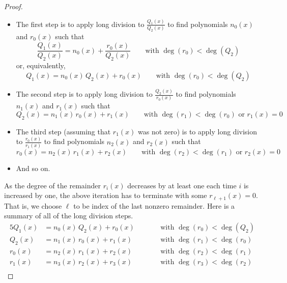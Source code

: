 \begin{proof}
\begin{itemize}\itemsep1pt \parskip0pt  %
\item
The first step is to apply long division to $\frac{Q_1(x)}{Q_2(x)}$ 
to find polynomials $n_0(x)$ 
and $r_0(x)$ such that 
\begin{equation*}
\frac{Q_1(x)}{Q_2(x)} = n_0(x) +\frac{r_0(x)}{Q_2(x)}\qquad
         \text{with $\deg(r_0)<\deg(Q_2)$}
\end{equation*}
or, equivalently,
\begin{equation*}
Q_1(x) = n_0(x)\,Q_2(x) + r_0(x)\qquad
         \text{with $\deg(r_0)<\deg(Q_2)$}
\end{equation*}
\item
The second step is to apply long division to $\frac{Q_2(x)}{r_0(x)}$ 
to find polynomials $n_1(x)$ and $r_1(x)$ such that 
\begin{equation*}
Q_2(x) = n_1(x)\,r_0(x) + r_1(x)\qquad
         \text{with $\deg(r_1)<\deg(r_0)$\ \  or\ \  $r_1(x)=0$}
\end{equation*}
\item
The third step (assuming that $r_1(x)$ was not zero) is to apply long division 
to $\frac{r_0(x)}{r_1(x)}$ to find polynomials $n_2(x)$ 
and $r_2(x)$ such that 
\begin{equation*}
r_0(x) = n_2(x)\,r_1(x) + r_2(x)\qquad
         \text{with $\deg(r_2)<\deg(r_1)$\ \  or\ \  $r_2(x)=0$}
\end{equation*}
\item
And so on.
\end{itemize}
As the degree of the remainder $r_i(x)$ decreases by at least one each time $i$ is increased by one, the above iteration has to terminate with some  $r_{\ell+1}(x)=0$.
That is, we choose $\ell$ to be index of the last nonzero remainder.
Here is a summary of all of the long division steps.
\begin{alignat*}{5}
Q_1(x)&=n_0(x)\, Q_2(x) + r_0(x)\qquad 
             &&\text{with $\deg(r_0)<\deg(Q_2)$} \\
Q_2(x)&=n_1(x)\, r_0(x) + r_1(x)\qquad 
             &&\text{with $\deg(r_1)<\deg(r_0)$} \\
r_0(x)&=n_2(x)\,r_1(x)+r_2(x)\qquad 
            &&\text{with $\deg(r_2)<\deg(r_1)$} \\
r_1(x)&=n_3(x)\,r_2(x)+r_3(x)\qquad 
            &&\text{with $\deg(r_3)<\deg(r_2)$} \\

\end{alignat*}
\end{proof}
